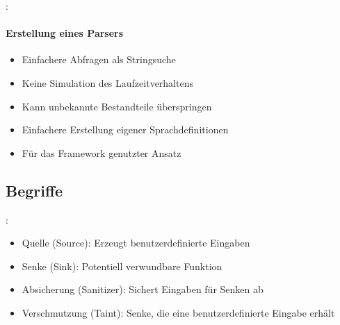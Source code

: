         \begin{frame}{\secname: \subsecname}
            \framesubtitle{Erstellung eines Parsers}
            \begin{itemize}
                \item Einfachere Abfragen als Stringsuche
                \item Keine Simulation des Laufzeitverhaltens
                \item[\textrightarrow] Kann unbekannte Bestandteile überspringen
                \item[\textrightarrow] Einfachere Erstellung eigener Sprachdefinitionen
                \item Für das Framework genutzter Ansatz
            \end{itemize}
        \end{frame}

    \subsection{Begriffe}
        \begin{frame}{\secname: \subsecname}
            \begin{itemize}
                \item Quelle (Source): Erzeugt benutzerdefinierte Eingaben
                \item Senke (Sink): Potentiell verwundbare Funktion
                \item Absicherung (Sanitizer): Sichert Eingaben für Senken ab
                \item Verschmutzung (Taint): Senke, die eine benutzerdefinierte Eingabe erhält
            \end{itemize}
        \end{frame}
